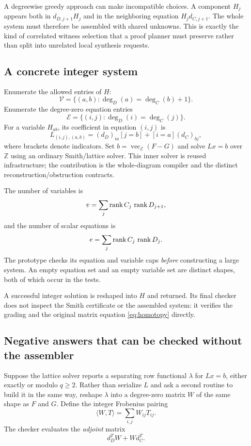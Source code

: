 \documentclass[11pt,letterpaper]{article}
\theoremstyle{definition}\newtheorem{definition}[theorem]{Definition}
\theoremstyle{remark}\newtheorem{remark}[theorem]{Remark}
\newcommand{\Z}{\mathbb Z}\newcommand{\Q}{\mathbb Q}
\newcommand{\pair}[2]{\langle #1,#2\rangle}
\begin{document}
A degreewise greedy approach can make incompatible choices. A component $H_j$
appears both in $d_{D,j+1}H_j$ and in the neighboring equation
$H_jd_{C,j+1}$. The whole system must therefore be assembled with shared unknowns.
This is exactly the kind of correlated witness selection that a proof planner
must preserve rather than split into unrelated local synthesis requests.

\subsection{A concrete integer system}
Enumerate the allowed entries of $H$:
\[
 \mathcal V=\{(a,b):\deg_D(a)=\deg_C(b)+1\}.
\]
Enumerate the degree-zero equation entries
\[
 \mathcal E=\{(i,j):\deg_D(i)=\deg_C(j)\}.
\]
For a variable $H_{ab}$, its coefficient in equation $(i,j)$ is
\begin{equation}\label{eq:assembly}
 L_{(i,j),(a,b)}
 =(d_D)_{ia}[j=b]+[i=a](d_C)_{bj},
\end{equation}
where brackets denote indicators. Set $b=\operatorname{vec}_{\mathcal E}(F-G)$
and solve $Lx=b$ over $\Z$ using an ordinary Smith/lattice solver.
This inner solver is reused infrastructure; the contribution is the
whole-diagram compiler and the distinct reconstruction/obstruction contracts.

The number of variables is
\[
 v=\sum_j\operatorname{rank} C_j\,\operatorname{rank} D_{j+1},
\]
and the number of scalar equations is
\[
 e=\sum_j\operatorname{rank} C_j\,\operatorname{rank} D_j.
\]
The prototype checks its equation and variable caps \emph{before} constructing
a large system. An empty equation set and an empty variable set are distinct
shapes, both of which occur in the tests.

A successful integer solution is reshaped into $H$ and returned. Its final
checker does not inspect the Smith certificate or the assembled system:
it verifies the grading and the original matrix equation
\eqref{eq:homotopy} directly.

\subsection{Negative answers that can be checked without the assembler}
Suppose the lattice solver reports a separating row functional $\lambda$ for
$Lx=b$, either exactly or modulo $q\geq2$. Rather than serialize $L$ and ask a
second routine to build it in the same way, reshape $\lambda$ into a degree-zero
matrix $W$ of the same shape as $F$ and $G$.
Define the integer Frobenius pairing
\[
 \pair{W}{T}=\sum_{i,j}W_{ij}T_{ij}.
\]
The checker evaluates the \emph{adjoint} matrix
\begin{equation}\label{eq:adjoint}
 d_D^T W+Wd_C^T.
\end{equation}
\end{document}
